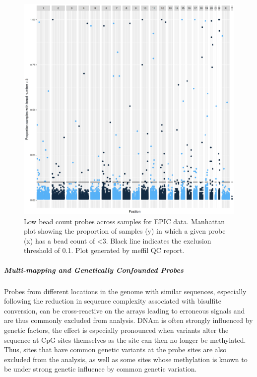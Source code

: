 \documentclass[]{book}
\let\oldsubparagraph\subparagraph
\renewcommand{\subparagraph}[1]{\oldsubparagraph{#1}\mbox{}}
\begin{document}
\begin{figure}

{\centering \includegraphics[width=0.8\linewidth]{figs/MAVIDOSqcEPICbeadNumAcross} 

}

\caption{Low bead count probes across samples for EPIC data. Manhattan plot showing the proportion of samples (y) in which a given probe (x) has a bead count of \textless3. Black line indicates the exclusion threshold of 0.1. Plot generated by meffil QC report.}\label{fig:MAVIDOSqcEPICbeadNumAcross}
\end{figure}



\hypertarget{multi-mapping-and-genetically-confounded-probes}{%
\subparagraph{Multi-mapping and Genetically Confounded Probes}\label{multi-mapping-and-genetically-confounded-probes}}

Probes from different locations in the genome with similar sequences, especially following the reduction in sequence complexity associated with bisulfite conversion, can be cross-reactive on the arrays leading to erroneous signals and are thus commonly excluded from analysis. DNAm is often strongly influenced by genetic factors, the effect is especially pronounced when variants alter the sequence at CpG sites themselves as the site can then no longer be methylated. Thus, sites that have common genetic variants at the probe sites are also excluded from the analysis, as well as some sites whose methylation is known to be under strong genetic influence by common genetic variation.
\end{document}
